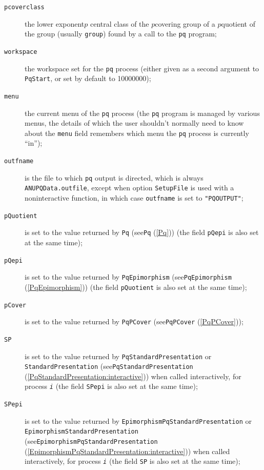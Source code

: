 \documentclass[a4paper,11pt]{report}
\begin{document}
{{{\begin{description}
\item[{\texttt{pcoverclass}}]  the lower exponent\texttt{}$p$ central class of the $p$\texttt{}covering group of a $p$\texttt{}quotient of the group (usually \texttt{group}) found by a call to the \texttt{pq} program; 
\item[{\texttt{workspace}}]  the workspace set for the \texttt{pq} process (either given as a second argument to \texttt{PqStart}, or set by default to 10000000); 
\item[{\texttt{menu}}]  the current menu of the \texttt{pq} process (the \texttt{pq} program is managed by various menus, the details of which the user shouldn't
normally need to know about \texttt{}\texttt{} the \texttt{menu} field remembers which menu the \texttt{pq} process is currently ``in''); 
\item[{\texttt{outfname}}]  is the file to which \texttt{pq} output is directed, which is always \texttt{ANUPQData.outfile}, except when option \texttt{SetupFile} is used with a non\texttt{}interactive function, in which case \texttt{outfname} is set to \texttt{"PQ{\textunderscore}OUTPUT"}; 
\item[{\texttt{pQuotient}}]  is set to the value returned by \texttt{Pq} (see{\nobreakspace}\texttt{Pq} (\ref{Pq})) (the field \texttt{pQepi} is also set at the same time); 
\item[{\texttt{pQepi}}]  is set to the value returned by \texttt{PqEpimorphism} (see{\nobreakspace}\texttt{PqEpimorphism} (\ref{PqEpimorphism})) (the field \texttt{pQuotient} is also set at the same time); 
\item[{\texttt{pCover}}]  is set to the value returned by \texttt{PqPCover} (see{\nobreakspace}\texttt{PqPCover} (\ref{PqPCover})); 
\item[{\texttt{SP}}]  is set to the value returned by \texttt{PqStandardPresentation} or \texttt{StandardPresentation} (see{\nobreakspace}\texttt{PqStandardPresentation} (\ref{PqStandardPresentation:interactive})) when called interactively, for process \mbox{\texttt{\mdseries\slshape i}} (the field \texttt{SPepi} is also set at the same time); 
\item[{\texttt{SPepi}}]  is set to the value returned by \texttt{EpimorphismPqStandardPresentation} or \texttt{EpimorphismStandardPresentation} (see{\nobreakspace}\texttt{EpimorphismPqStandardPresentation} (\ref{EpimorphismPqStandardPresentation:interactive})) when called interactively, for process \mbox{\texttt{\mdseries\slshape i}} (the field \texttt{SP} is also set at the same time); 

\end{description}}}}
\end{document}
